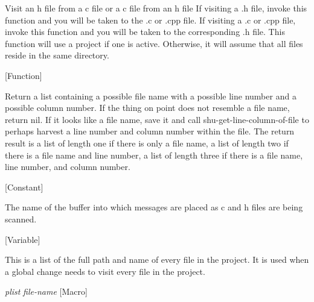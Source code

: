 \begin{doc-string}
Visit an h file from a c file or a c file from an h file If visiting a .h
file, invoke this function and you will be taken to the .c or .cpp file.  If
visiting a .c or .cpp file, invoke this function and you will be taken to the
corresponding .h file.  This function will use a project if one is active.
Otherwise, it will assume that all files reside in the same directory.
\end{doc-string}

\vspace{1em}
\noindent
{}
\usebox{\funcname}
 \hfill [Function]

\begin{doc-string}
Return a list containing a possible file name with a possible line number
and a possible column number.  If the thing on point does not resemble a file
name, return nil.  If it looks like a file name, save it and call
shu-get-line-column-of-file to perhaps harvest a line number and column number
within the file.  The return result is a list of length one if there is only
a file name, a list of length two if there is a file name and line number, a
list of length three if there is a file name, line number, and column number.
\end{doc-string}

\vspace{1em}
\noindent
{}
\usebox{\funcname}
 \hfill [Constant]

\begin{doc-string}
The name of the buffer into which messages are placed as c and h files
are being scanned.
\end{doc-string}

\vspace{1em}
\noindent
{}
\usebox{\funcname}
 \hfill [Variable]

\begin{doc-string}
This is a list of the full path and name of every file in the project.
It is used when a global change needs to visit every file in the project.
\end{doc-string}

\vspace{1em}
\noindent
{}
\usebox{\funcname}\emph{plist} \emph{file-name}
 \hfill [Macro]
\hspace*{\wd\funcname}

